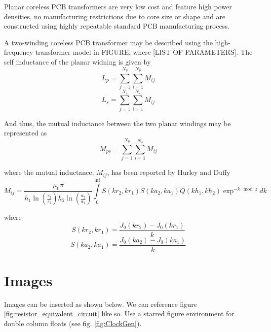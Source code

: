\documentclass[conference]{IEEEtran}
\begin{document}
Planar coreless PCB transformers are very low cost and feature high power densities, no manufacturing restrictions due to core size or shape and are constructed using highly repeatable standard PCB manufacturing process. 

A two-winding coreless PCB transformer may be described using the high-frequency transformer model in FIGURE, where [LIST OF PARAMETERS].
The self inductance of the planar widning is given by
\begin{equation}
	L_{p} = \sum\limits_{j=1}^{N_{p}}{\sum\limits_{i=1}^{N_{p}}{M_{ij}}}
\end{equation}
%
\begin{equation}
	L_{s} = \sum\limits_{j=1}^{N_{s}}{\sum\limits_{i=1}^{N_{s}}{M_{ij}}}
\end{equation}

And thus, the mutual inductance between the two planar windings may be represented as
%
\begin{equation}
	M_{ps} = \sum\limits_{j=1}^{N_{p}}{\sum\limits_{i=1}^{N_{s}}{M_{ij}}}
\end{equation}

where the mutual inductance, $ M_{ij} $, has been reported by Hurley and Duffy \cite{HurleyDuffy}
%
\begin{equation}
	M_{ij} = \frac{\mu_{0}\pi}{h_{1}\ln(\frac{r_{2}}{r_{1}})h_{2}\ln(\frac{a_{2}}{a_{1}})}\int\limits_{0}^{\inf}{S(kr_{2},kr_{1})S(ka_{2},ka_{1})Q(kh_{1},kh_{2})\exp^{-k\mod{z}}dk}
\end{equation}

where
\begin{equation}
	S(kr_{2},kr_{1}) = \frac{J_{0}(kr_{2})-J_{0}(kr_{1})}{k}
\end{equation}
%
\begin{equation}
	S(ka_{2},ka_{1}) = \frac{J_{0}(ka_{2})-J_{0}(ka_{1})}{k}
\end{equation}

\section{Images}

Images can be inserted as shown below. We can reference figure \ref{fig:resistor_equivalent_circuit} like so. Use a starred figure environment for double column floats (see fig. \ref{fig:ClockGen}).
\end{document}

